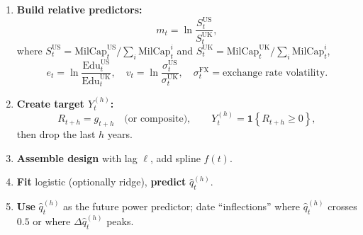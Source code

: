 \documentclass[11pt]{article}
\newcommand{\US}{\mathrm{US}}
\newcommand{\UK}{\mathrm{UK}}
\newcommand{\ind}[1]{\mathbf{1}\!\left\{#1\right\}}
\begin{document}
\begin{enumerate}[leftmargin=1.5em]
\item \textbf{Build relative predictors:}
\[
m_t = \ln\!\frac{S^{\US}_t}{S^{\UK}_t},
\]
where $S^{\US}_t = \mathrm{MilCap}^{\US}_t/\sum_i \mathrm{MilCap}^i_t$ and $S^{\UK}_t = \mathrm{MilCap}^{\UK}_t/\sum_i \mathrm{MilCap}^i_t$,
\[
e_t = \ln\!\frac{\mathrm{Edu}^{\US}_t}{\mathrm{Edu}^{\UK}_t},\quad
v_t = \ln\!\frac{\sigma^{\US}_t}{\sigma^{\UK}_t},\quad
\sigma^{\text{FX}}_t = \text{exchange rate volatility}.
\]

\item \textbf{Create target $Y^{(h)}_t$:}
\[
R_{t+h} = g_{t+h}\quad\text{(or composite)},\qquad
Y^{(h)}_t = \ind{R_{t+h}\ge 0},
\]
then drop the last $h$ years.

\item \textbf{Assemble design} with lag $\ell$, add spline $f(t)$.

\item \textbf{Fit} logistic (optionally ridge), \textbf{predict} $\hat q^{(h)}_t$.

\item \textbf{Use} $\hat q^{(h)}_t$ as the future power predictor; date ``inflections'' where $\hat q^{(h)}_t$ crosses $0.5$ or where $\Delta \hat q^{(h)}_t$ peaks.
\end{enumerate}
\end{document}
